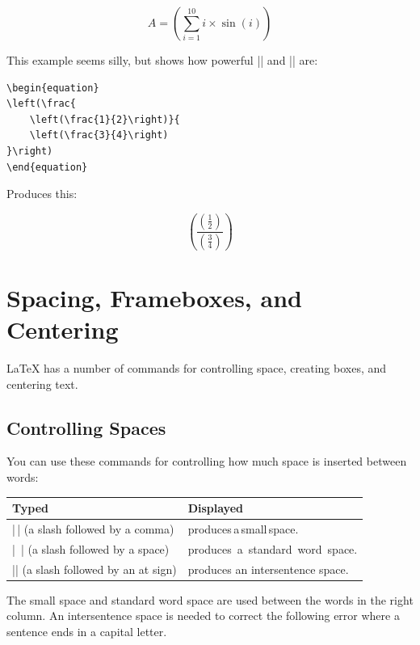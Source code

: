 \begin{equation}
A = \left( \sum_{i=1}^{10}i\times\sin(i) \right)
\end{equation}

This example  seems silly, but shows  how powerful
|\left| and |\right|  are:

\begin{Verbatim}
\begin{equation}
\left(\frac{
    \left(\frac{1}{2}\right)}{
    \left(\frac{3}{4}\right)
}\right)
\end{equation}
\end{Verbatim}

Produces this:

\begin{equation}
\left(\frac{
    \left(\frac{1}{2}\right)}{
    \left(\frac{3}{4}\right)
}\right)
\end{equation}



\section{Spacing, Frameboxes, and Centering}
\LaTeX{} has a number of commands for controlling space, creating
boxes, and centering text.

\subsection{Controlling Spaces}

You can use these commands for controlling how much space is inserted
between words:

\begin{center}
\begin{tabular}{l|l}
Typed                                 & Displayed\\\hline
|\,| (a slash followed by a comma)    & produces\,a\,small\,space. \\
|\ | (a slash followed by a space)    & produces\ a\ standard\ word\ space. \\
|\@| (a slash followed by an at sign) & produces an intersentence space. \\
\end{tabular}
\end{center}


The small space and standard word space are used between the words in the right column.  An intersentence space is needed to correct the following error where a sentence ends in a capital letter.


